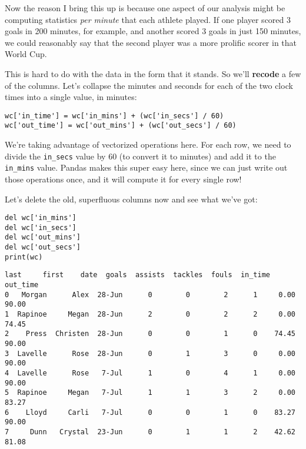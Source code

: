 Now the reason I bring this up is because one aspect of our analysis might be
computing statistics \textit{per minute} that each athlete played. If one
player scored 3 goals in 200 minutes, for example, and another scored 3 goals
in just 150 minutes, we could reasonably say that the second player was a more
prolific scorer in that World Cup.


This is hard to do with the data in the form that it stands. So we'll
\textbf{recode} a few of the columns. Let's collapse the minutes and seconds
for each of the two clock times into a single value, in minutes:

\begin{Verbatim}[fontsize=\small,samepage=true,frame=single,framesep=3mm]
wc['in_time'] = wc['in_mins'] + (wc['in_secs'] / 60)
wc['out_time'] = wc['out_mins'] + (wc['out_secs'] / 60)
\end{Verbatim}


We're taking advantage of vectorized operations here. For each row, we need to
divide the \texttt{in\_secs} value by 60 (to convert it to minutes) and add it
to the \texttt{in\_mins} value. Pandas makes this super easy here, since we can
just write out those operations once, and it will compute it for every single
row!

Let's delete the old, superfluous columns now and see what we've got:

\begin{samepage}
\begin{Verbatim}[fontsize=\small,samepage=true,frame=single,framesep=3mm]
del wc['in_mins']
del wc['in_secs']
del wc['out_mins']
del wc['out_secs']
print(wc)
\end{Verbatim}
\vspace{-.2in}

\begin{Verbatim}[fontsize=\scriptsize,samepage=true,frame=leftline,framesep=5mm,framerule=1mm]
      last     first    date  goals  assists  tackles  fouls  in_time  out_time
0   Morgan      Alex  28-Jun      0        0        2      1     0.00     90.00
1  Rapinoe     Megan  28-Jun      2        0        2      2     0.00     74.45
2    Press  Christen  28-Jun      0        0        1      0    74.45     90.00
3  Lavelle      Rose  28-Jun      0        1        3      0     0.00     90.00
4  Lavelle      Rose   7-Jul      1        0        4      1     0.00     90.00
5  Rapinoe     Megan   7-Jul      1        1        3      2     0.00     83.27
6    Lloyd     Carli   7-Jul      0        0        1      0    83.27     90.00
7     Dunn   Crystal  23-Jun      0        1        1      2    42.62     81.08
\end{Verbatim}
\end{samepage}

